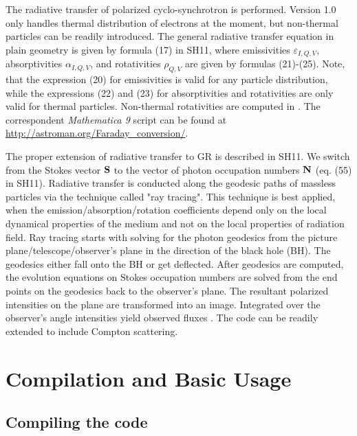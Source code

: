 \documentclass{emulateapj}
\newcommand{\mat}{\textit{Mathematica 9 }}
\begin{document}
The radiative transfer of polarized cyclo-synchrotron is
performed. Version 1.0 only handles thermal distribution of electrons
at the moment, but non-thermal particles can be readily introduced.
The general radiative transfer equation in plain geometry is given by
formula (17) in SH11, where emissivities $\varepsilon_{I,Q,V}$,
absorptivities $\alpha_{I,Q,V}$, and rotativities $\rho_{Q,V}$ are
given by formulas (21)-(25). Note, that the expression (20) for
emissivities is valid for any particle distribution, while the
expressions (22) and (23) for absorptivities and rotativities are only
valid for thermal particles. Non-thermal rotativities are computed in
\citet{Huang:2011de}. The correspondent \mat script can be found at
\url{http://astroman.org/Faraday_conversion/}.

The proper extension of radiative transfer to GR is described in
SH11. We switch from the Stokes vector ${\bf S}$ to the vector of
photon occupation numbers ${\bf N}$ (eq. (55) in SH11).  Radiative
transfer is conducted along the geodesic paths of massless particles
via the technique called "ray tracing". This technique is best
applied, when the emission/absorption/rotation coefficients depend
only on the local dynamical properties of the medium and not on the
local properties of radiation field.  Ray tracing starts with solving
for the photon geodesics from the picture plane/telescope/observer's
plane in the direction of the black hole (BH).  The geodesics either
fall onto the BH or get deflected. After geodesics are computed, the
evolution equations on Stokes occupation numbers are solved from the
end points on the geodesics back to the observer's plane. The
resultant polarized intensities on the plane are transformed into an
image.  Integrated over the observer's angle intensities yield
observed fluxes \citep{Rybicki1979}. The code can be readily extended
to include Compton scattering.


\section{Compilation and Basic Usage}
\subsection{{\bf Compiling} the code}
\end{document}
